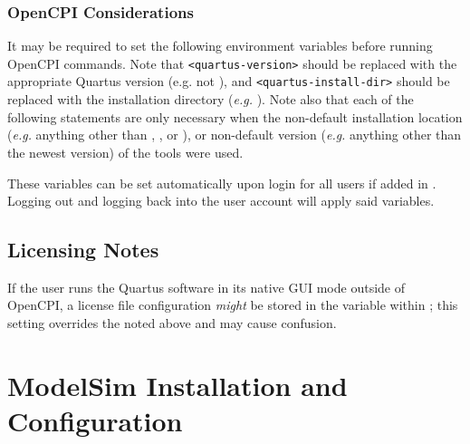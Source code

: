 \begin{flushleft}
\subsubsection{OpenCPI Considerations}
It may be required to set the following environment variables before running OpenCPI commands. Note that \texttt{<quartus-version>} should be replaced with the appropriate Quartus version (e.g.  not ), and \texttt{<quartus-install-dir>} should be replaced with the installation directory (\textit{e.g.} ). Note also that each of the following  statements are only necessary when the non-default installation location (\textit{e.g.} anything other than , ,  or ), or non-default version (\textit{e.g.} anything other than the newest version) of the tools were used.\newline
{}\newline
{}\newline
{}

These variables can be set automatically upon login for all users if added in . Logging out and logging back into the user account will apply said variables.
\end{flushleft}

\begin{flushleft}
\subsection{Licensing Notes}
If the user runs the Quartus software in its native GUI mode outside of OpenCPI, a license file configuration \textit{might} be stored in the variable  within ; this setting overrides the  noted above and may cause confusion.

\end{flushleft}

\section{ModelSim Installation and Configuration}
